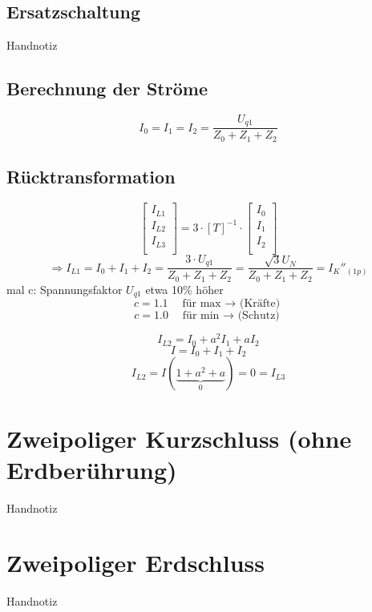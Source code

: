 \documentclass[a4,paper,fleqn]{article}
\begin{document}
\subsection{Ersatzschaltung}
Handnotiz

\subsection{Berechnung der Ströme}
\[ I_0 = I_1 = I_2 = \frac{U_{q1}}{Z_0 + Z_1 + Z_2} \]

\subsection{Rücktransformation}
\[
\left[
    \begin{array}{l}
        I_{L1}\\
        I_{L2}\\
        I_{L3}\\
    \end{array}
\right]
= 3 \cdot [T]^{-1} \cdot
\left[
    \begin{array}{l}
        I_0\\
        I_1\\
        I_2\\
    \end{array}
\right]
\]
\[ \Rightarrow I_{L1} = I_0 + I_1 + I_2
= \frac{3 \cdot U_{q1}}{Z_0 + Z_1 + Z_2}
= \frac{\sqrt{3}U_N}{Z_0 + Z_1 + Z_2}
= {I_{K}}''_{(1p)}\]
mal c: Spannungsfaktor $U_{q1}$ etwa 10\% höher
\[ c = 1.1 \quad \text{für max $\to$ (Kräfte)} \]
\[ c = 1.0 \quad \text{für min $\to$ (Schutz)} \]

\[ I_{L2} = I_0 + a^2 I_1 + a I_2 \]
\[ I = I_0 + I_1 + I_2 \]
\[ I_{L2} = I (\underbrace{1 + a^2 + a}_{0}) = 0 = I_{L3} \]

\section{Zweipoliger Kurzschluss (ohne Erdberührung)}
Handnotiz

\section{Zweipoliger Erdschluss}
Handnotiz
\end{document}
